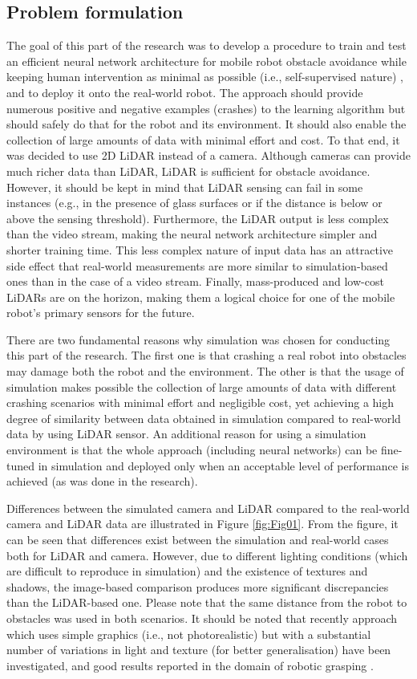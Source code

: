 \subsection{Problem formulation}

The goal of this part of the research was to develop a procedure to train and test an efficient neural network architecture for mobile robot obstacle avoidance while keeping human intervention as minimal as possible (i.e., self-supervised nature) \cite{Kruzic2020a}, and to deploy it onto the real-world robot. The approach should provide numerous positive and negative examples (crashes) to the learning algorithm but should safely do that for the robot and its environment.  It should also enable the collection of large amounts of data with minimal effort and cost. To that end, it was decided to use 2D LiDAR instead of a camera. Although cameras can provide much richer data than LiDAR, LiDAR is sufficient for obstacle avoidance. However, it should be kept in mind that LiDAR sensing can fail in some instances (e.g., in the presence of glass surfaces or if the distance is below or above the sensing threshold). Furthermore, the LiDAR output is less complex than the video stream, making the neural network architecture simpler and shorter training time. This less complex nature of input data has an attractive side effect that real-world measurements are more similar to simulation-based ones than in the case of a video stream. Finally, mass-produced and low-cost LiDARs are on the horizon, making them a logical choice for one of the mobile robot's primary sensors for the future.

There are two fundamental reasons why simulation was chosen for conducting this part of the research. The first one is that crashing a real robot into obstacles may damage both the robot and the environment. The other is that the usage of simulation makes possible the collection of large amounts of data with different crashing scenarios with minimal effort and negligible cost, yet achieving a high degree of similarity between data obtained in simulation compared to real-world data by using LiDAR sensor. An additional reason for using a simulation environment is that the whole approach (including neural networks) can be fine-tuned in simulation and deployed only when an acceptable level of performance is achieved (as was done in the research).

Differences between the simulated camera and LiDAR compared to the real-world camera and LiDAR data are illustrated in Figure \ref{fig:Fig01}. From the figure, it can be seen that differences exist between the simulation and real-world cases both for LiDAR and camera. However, due to different lighting conditions (which are difficult to reproduce in simulation) and the existence of textures and shadows, the image-based comparison produces more significant discrepancies than the LiDAR-based one. Please note that the same distance from the robot to obstacles was used in both scenarios. It should be noted that recently approach which uses simple graphics (i.e., not photorealistic) but with a substantial number of variations in light and texture (for better generalisation) have been investigated, and good results reported in the domain of robotic grasping \cite{Bousmalis2018}.

